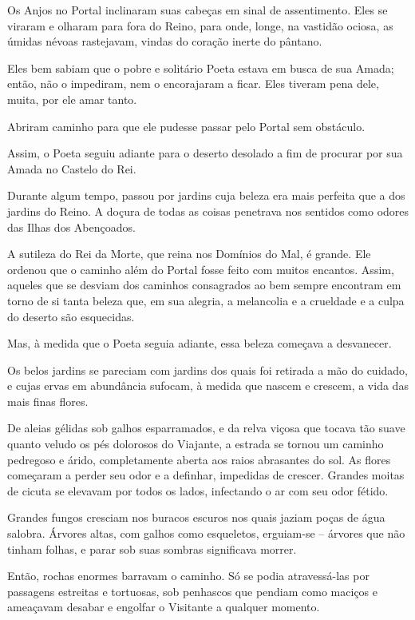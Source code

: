 Os Anjos no Portal inclinaram suas cabeças em sinal de assentimento.
Eles se viraram e olharam para fora do Reino, para onde, longe, na
vastidão ociosa, as úmidas névoas rastejavam, vindas do coração inerte
do pântano.

Eles bem sabiam que o pobre e solitário Poeta estava em busca de sua
Amada; então, não o impediram, nem o encorajaram a ficar. Eles tiveram
pena dele, muita, por ele amar tanto.

Abriram caminho para que ele pudesse passar pelo Portal sem obstáculo.

Assim, o Poeta seguiu adiante para o deserto desolado a fim de procurar
por sua Amada no Castelo do Rei.

Durante algum tempo, passou por jardins cuja beleza era mais perfeita
que a dos jardins do Reino. A doçura de todas as coisas penetrava nos
sentidos como odores das Ilhas dos Abençoados.

A sutileza do Rei da Morte, que reina nos Domínios do Mal, é grande. Ele
ordenou que o caminho além do Portal fosse feito com muitos encantos.
Assim, aqueles que se desviam dos caminhos consagrados ao bem sempre
encontram em torno de si tanta beleza que, em sua alegria, a melancolia
e a crueldade e a culpa do deserto são esquecidas.

Mas, à medida que o Poeta seguia adiante, essa beleza começava a
desvanecer.

Os belos jardins se pareciam com jardins dos quais foi retirada a mão do
cuidado, e cujas ervas em abundância sufocam, à medida que nascem e
crescem, a vida das mais finas flores.

De aleias gélidas sob galhos esparramados, e da relva viçosa que tocava
tão suave quanto veludo os pés dolorosos do Viajante, a estrada se
tornou um caminho pedregoso e árido, completamente aberta aos raios
abrasantes do sol. As flores começaram a perder seu odor e a definhar,
impedidas de crescer. Grandes moitas de cicuta se elevavam por todos os
lados, infectando o ar com seu odor fétido.

Grandes fungos cresciam nos buracos escuros nos quais jaziam poças de
água salobra. Árvores altas, com galhos como esqueletos, erguiam-se --
árvores que não tinham folhas, e parar sob suas sombras significava
morrer.

Então, rochas enormes barravam o caminho. Só se podia atravessá-las por
passagens estreitas e tortuosas, sob penhascos que pendiam como maciços
e ameaçavam desabar e engolfar o Visitante a qualquer momento.


